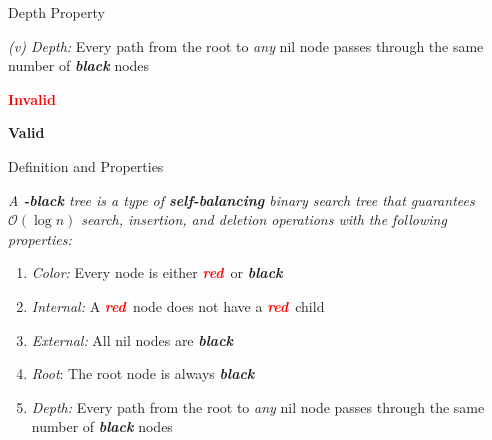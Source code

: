\documentclass[aspectratio=169]{beamer}
\newcommand{\textib}[1]{\textit{\textbf{{#1}}}}
\newcommand{\red}{\textib{\textcolor{red}{red}}}
\newcommand{\define}[1]{\begin{tcolorbox}[title={Definition}]\small{\textit{{#1}}}\end{tcolorbox}}
\begin{document}
\begin{frame}[fragile]{Depth Property}
    \vspace{-3em}

    \begin{minipage}[t][0.2\textheight][c]{\linewidth}
        \textit{(v) Depth:} Every path from the root to \textit{any} nil node passes through the same number 
        of \textib{black} nodes
    \end{minipage}
    \vspace{-3em}

    \begin{minipage}[t][0.6\textheight][c]{\linewidth}
         {
            \depthone
        }
         {\depthtwo}
         {\textbf{\textcolor{red}{Invalid}}}
        \vspace{1.1em}

         {\depththree}
         {
            \vspace{-2em}
            \textbf{Valid}
        }
    \end{minipage}
\end{frame}



\begin{frame}[fragile]{Definition and Properties}
    \define{
        A \textib{\color{red}{red}}\textib{-black} tree is a type of \textib{self-balancing} binary 
        search tree that guarantees $\mathcal{O}(\log n)$ search, insertion, and deletion operations
        with the following properties:
    }
    \begin{enumerate}[label=\textit{(\roman*)}]
        \item \textit{Color:} Every node is either \red \ or \textib{black}
        \item \textit{Internal:} A \red \ node does not have a \red \ child
        \item \textit{External:} All nil nodes are \textib{black}
        \item \textit{Root}: The root node is always \textib{black}
        \item \textit{Depth:} Every path from the root to \textit{any} nil node passes through
            the same number of \textib{black} nodes
    \end{enumerate}
\end{frame}
\end{document}
